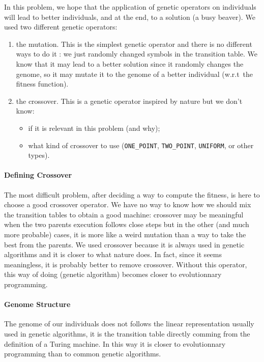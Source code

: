 \documentclass{report}
\begin{document}
In this problem, we hope that the application of genetic operators on individuals will lead to better individuals, and at the end, to a solution (a busy beaver).
We used two different genetic operators:
\begin{enumerate}
\item the mutation. This is the simplest genetic operator and there is no different ways to do it : we just randomly changed symbols in the transition table. We know that it may lead to a better solution since it randomly changes the genome, so it may mutate it to the genome of a better individual (w.r.t\ the fitness function).
\item the crossover. This is a genetic operator inspired by nature but we don't know:
  \begin{itemize}
  \item if it is relevant in this problem (and why);
  \item what kind of crossover to use (\texttt{ONE\_POINT}, \texttt{TWO\_POINT}, \texttt{UNIFORM}, or other types).
  \end{itemize}
\end{enumerate}

\paragraph{Defining Crossover}
The most difficult problem, after deciding a way to compute the fitness, is here to choose a good crossover operator. We have no way to know how we should mix the transition tables to obtain a good machine: crossover may be meaningful when the two parents execution follows close steps but in the other (and much more probable) cases, it is more like a weird mutation than a way to take the best from the parents.
We used crossover because it is always used in genetic algorithms and it is closer to what nature does. In fact, since it seems meaningless, it is probably better to remove crossover. 
Without this operator, this way of doing (genetic algorithm) becomes closer to evolutionnary programming.

\paragraph{Genome Structure}
The genome of our individuals does not follows the linear representation usually used in genetic algorithms, it is the transition table directly comming from the definition of a Turing machine. In this way it is closer to evolutionnary programming than to common genetic algorithms.
\end{document}
